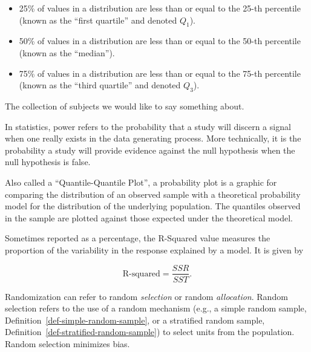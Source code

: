 \documentclass[
  letterpaper,
  DIV=11,
  numbers=noendperiod]{scrreprt}
\providecommand{\tightlist}{%
  \setlength{\itemsep}{0pt}\setlength{\parskip}{0pt}}\usepackage{longtable,booktabs,array}
\theoremstyle{plain}
\theoremstyle{definition}
\theoremstyle{definition}
\theoremstyle{remark}
\begin{document}
\begin{itemize}
\tightlist
\item
  25\% of values in a distribution are less than or equal to the 25-th
  percentile (known as the ``first quartile'' and denoted \(Q_1\)).
\item
  50\% of values in a distribution are less than or equal to the 50-th
  percentile (known as the ``median'').
\item
  75\% of values in a distribution are less than or equal to the 75-th
  percentile (known as the ``third quartile'' and denoted \(Q_3\)).
\end{itemize}

\begin{description}
\tightlist
\item[Population (Definition~\ref{def-population})]
The collection of subjects we would like to say something about.
\item[Power (Definition~\ref{def-power})]
In statistics, power refers to the probability that a study will discern
a signal when one really exists in the data generating process. More
technically, it is the probability a study will provide evidence against
the null hypothesis when the null hypothesis is false.
\item[Probability Plot (Definition~\ref{def-probability-plot})]
Also called a ``Quantile-Quantile Plot'', a probability plot is a
graphic for comparing the distribution of an observed sample with a
theoretical probability model for the distribution of the underlying
population. The quantiles observed in the sample are plotted against
those expected under the theoretical model.
\item[R-Squared (Definition~\ref{def-r-squared})]
Sometimes reported as a percentage, the R-Squared value measures the
proportion of the variability in the response explained by a model. It
is given by
\end{description}

\[\text{R-squared} = \frac{SSR}{SST}.\]

\begin{description}
\tightlist
\item[Randomization (Definition~\ref{def-randomization})]
Randomization can refer to random \emph{selection} or random
\emph{allocation}. Random selection refers to the use of a random
mechanism (e.g., a simple random sample,
Definition~\ref{def-simple-random-sample}, or a stratified random
sample, Definition~\ref{def-stratified-random-sample}) to select units
from the population. Random selection minimizes bias.
\end{description}
\end{document}
